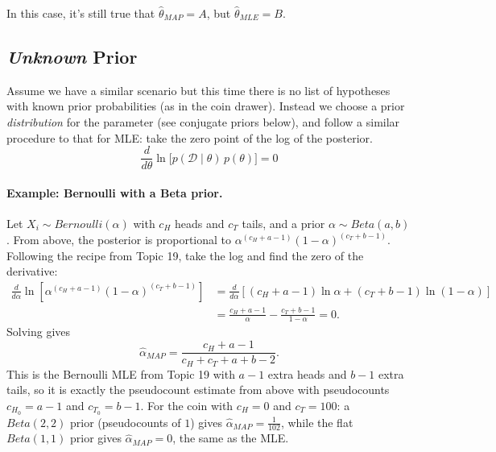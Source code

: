 In this case, it's still true that $\hat\theta_{MAP} = A$,
but $\hat\theta_{MLE} = B$. 


\subsection{\textit{Unknown} Prior}
Assume we have a similar scenario but this time there is no list of hypotheses with known prior probabilities (as in the coin drawer). 
Instead we choose a prior \emph{distribution} for the parameter (see conjugate priors below), 
and follow a similar procedure to that for MLE: 
take the zero point of the log of the posterior. 
\[\frac{d}{d\theta} \ln\bigl[p(\mathcal{D}\mid\theta)\,p(\theta)\bigr] = 0\]

\paragraph{Example: Bernoulli with a Beta prior.}
Let $X_i\sim Bernoulli(\alpha)$ with $c_H$ heads and $c_T$ tails, and a prior $\alpha\sim Beta(a,b)$. 
From above, the posterior is proportional to $\alpha^{(c_H+a-1)}(1-\alpha)^{(c_T+b-1)}$. 
Following the recipe from Topic 19, take the log and find the zero of the derivative:
\begin{align*}
\frac{d}{d\alpha} \ln\left[\alpha^{(c_H+a-1)}(1-\alpha)^{(c_T+b-1)}\right]
& = \frac{d}{d\alpha}\left[(c_H+a-1)\ln\alpha + (c_T+b-1)\ln(1-\alpha)\right]\\
& = \frac{c_H+a-1}{\alpha} - \frac{c_T+b-1}{1-\alpha} = 0.
\end{align*}
Solving gives
\[\hat\alpha_{MAP} = \frac{c_H+a-1}{c_H+c_T+a+b-2}.\]
This is the Bernoulli MLE from Topic 19 with $a-1$ extra heads and $b-1$ extra tails, 
so it is exactly the pseudocount estimate from above with pseudocounts $c_{H_0}=a-1$ and $c_{T_0}=b-1$. 
For the coin with $c_H=0$ and $c_T=100$: a $Beta(2,2)$ prior (pseudocounts of $1$) gives $\hat\alpha_{MAP}=\frac{1}{102}$, 
while the flat $Beta(1,1)$ prior gives $\hat\alpha_{MAP}=0$, the same as the MLE.

